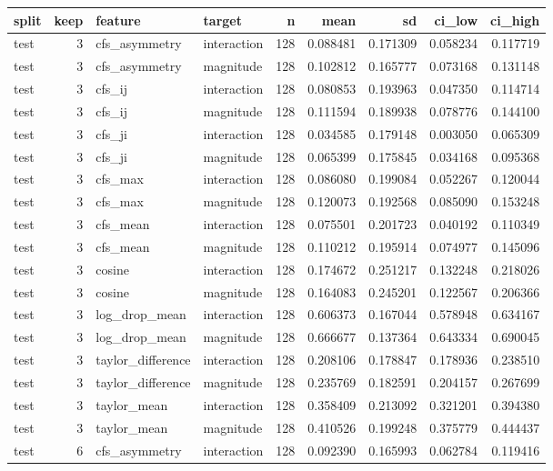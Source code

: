 \begin{tabular}{lrllrrrrr}
\toprule
split & keep & feature & target & n & mean & sd & ci_low & ci_high \\
\midrule
test & 3 & cfs_asymmetry & interaction & 128 & 0.088481 & 0.171309 & 0.058234 & 0.117719 \\
test & 3 & cfs_asymmetry & magnitude & 128 & 0.102812 & 0.165777 & 0.073168 & 0.131148 \\
test & 3 & cfs_ij & interaction & 128 & 0.080853 & 0.193963 & 0.047350 & 0.114714 \\
test & 3 & cfs_ij & magnitude & 128 & 0.111594 & 0.189938 & 0.078776 & 0.144100 \\
test & 3 & cfs_ji & interaction & 128 & 0.034585 & 0.179148 & 0.003050 & 0.065309 \\
test & 3 & cfs_ji & magnitude & 128 & 0.065399 & 0.175845 & 0.034168 & 0.095368 \\
test & 3 & cfs_max & interaction & 128 & 0.086080 & 0.199084 & 0.052267 & 0.120044 \\
test & 3 & cfs_max & magnitude & 128 & 0.120073 & 0.192568 & 0.085090 & 0.153248 \\
test & 3 & cfs_mean & interaction & 128 & 0.075501 & 0.201723 & 0.040192 & 0.110349 \\
test & 3 & cfs_mean & magnitude & 128 & 0.110212 & 0.195914 & 0.074977 & 0.145096 \\
test & 3 & cosine & interaction & 128 & 0.174672 & 0.251217 & 0.132248 & 0.218026 \\
test & 3 & cosine & magnitude & 128 & 0.164083 & 0.245201 & 0.122567 & 0.206366 \\
test & 3 & log_drop_mean & interaction & 128 & 0.606373 & 0.167044 & 0.578948 & 0.634167 \\
test & 3 & log_drop_mean & magnitude & 128 & 0.666677 & 0.137364 & 0.643334 & 0.690045 \\
test & 3 & taylor_difference & interaction & 128 & 0.208106 & 0.178847 & 0.178936 & 0.238510 \\
test & 3 & taylor_difference & magnitude & 128 & 0.235769 & 0.182591 & 0.204157 & 0.267699 \\
test & 3 & taylor_mean & interaction & 128 & 0.358409 & 0.213092 & 0.321201 & 0.394380 \\
test & 3 & taylor_mean & magnitude & 128 & 0.410526 & 0.199248 & 0.375779 & 0.444437 \\
test & 6 & cfs_asymmetry & interaction & 128 & 0.092390 & 0.165993 & 0.062784 & 0.119416 \\

\end{tabular}
